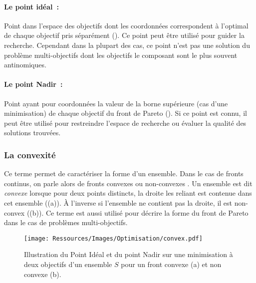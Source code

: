 \paragraph{Le point idéal~:} %
\label{par:le_point_idéal}
Point dans l’espace des objectifs dont les coordonnées correspondent à l’optimal
de chaque objectif pris séparément (). Ce point peut
être utilisé pour guider la recherche. Cependant dans la plupart des cas, ce
point n’est pas une solution du problème multi-objectifs dont les objectifs le
composant sont le plus souvent antinomiques.

\paragraph{Le point Nadir~:} %
\label{par:le_point_nadir}
Point ayant pour coordonnées la valeur de la borne supérieure (cas d’une
minimisation) de chaque objectif du front de Pareto ().
Si ce point est connu, il peut être utilisé pour restreindre l’espace de
recherche ou évaluer la qualité des solutions trouvées.


\subsubsection{La convexité} %
\label{ssub:la_convexite}
Ce terme permet de caractériser la forme d’un ensemble. Dans le cas de fronts continus,
on parle alors de fronts convexes ou non-convexes \parencite{Collette2002}. Un ensemble
est dit \textit{convexe} lorsque pour deux points distincts, la droite les reliant est
contenue dans cet ensemble ((a)). À l’inverse si l’ensemble ne
contient pas la droite, il est non-convex ((b)). Ce terme est
aussi utilisé pour décrire la forme du front de Pareto dans le cas de problèmes
multi-objectifs.

\begin{figure}
    \centering
    \texttt{[image: Ressources/Images/Optimisation/convex.pdf]}
    \caption[Illustration du Point Idéal et du point Nadir]
            {Illustration du Point Idéal et du point Nadir sur une minimisation
             à deux objectifs d’un ensemble $S$ pour un front convexe (a) et non
             convexe (b).}
    \label{fig:convex_nadir}
\end{figure}



